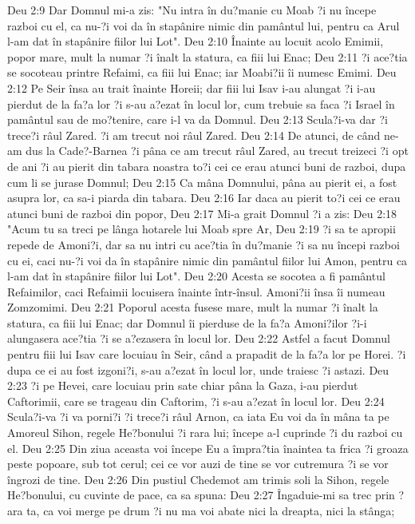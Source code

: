 Deu 2:9  Dar Domnul mi-a zis: "Nu intra în du?manie cu Moab ?i nu începe razboi cu el, ca nu-?i voi da în stapânire nimic din pamântul lui, pentru ca Arul l-am dat în stapânire fiilor lui Lot".
Deu 2:10  Înainte au locuit acolo Emimii, popor mare, mult la numar ?i înalt la statura, ca fiii lui Enac;
Deu 2:11  ?i ace?tia se socoteau printre Refaimi, ca fiii lui Enac; iar Moabi?ii îi numesc Emimi.
Deu 2:12  Pe Seir însa au trait înainte Horeii; dar fiii lui Isav i-au alungat ?i i-au pierdut de la fa?a lor ?i s-au a?ezat în locul lor, cum trebuie sa faca ?i Israel în pamântul sau de mo?tenire, care i-l va da Domnul.
Deu 2:13  Scula?i-va dar ?i trece?i râul Zared. ?i am trecut noi râul Zared.
Deu 2:14  De atunci, de când ne-am dus la Cade?-Barnea ?i pâna ce am trecut râul Zared, au trecut treizeci ?i opt de ani ?i au pierit din tabara noastra to?i cei ce erau atunci buni de razboi, dupa cum li se jurase Domnul;
Deu 2:15  Ca mâna Domnului, pâna au pierit ei, a fost asupra lor, ca sa-i piarda din tabara.
Deu 2:16  Iar daca au pierit to?i cei ce erau atunci buni de razboi din popor,
Deu 2:17  Mi-a grait Domnul ?i a zis:
Deu 2:18  "Acum tu sa treci pe lânga hotarele lui Moab spre Ar,
Deu 2:19  ?i sa te apropii repede de Amoni?i, dar sa nu intri cu ace?tia în du?manie ?i sa nu începi razboi cu ei, caci nu-?i voi da în stapânire nimic din pamântul fiilor lui Amon, pentru ca l-am dat în stapânire fiilor lui Lot".
Deu 2:20  Acesta se socotea a fi pamântul Refaimilor, caci Refaimii locuisera înainte într-însul. Amoni?ii însa îi numeau Zomzomimi.
Deu 2:21  Poporul acesta fusese mare, mult la numar ?i înalt la statura, ca fiii lui Enac; dar Domnul îi pierduse de la fa?a Amoni?ilor ?i-i alungasera ace?tia ?i se a?ezasera în locul lor.
Deu 2:22  Astfel a facut Domnul pentru fiii lui Isav care locuiau în Seir, când a prapadit de la fa?a lor pe Horei. ?i dupa ce ei au fost izgoni?i, s-au a?ezat în locul lor, unde traiesc ?i astazi.
Deu 2:23  ?i pe Hevei, care locuiau prin sate chiar pâna la Gaza, i-au pierdut Caftorimii, care se trageau din Caftorim, ?i s-au a?ezat în locul lor.
Deu 2:24  Scula?i-va ?i va porni?i ?i trece?i râul Arnon, ca iata Eu voi da în mâna ta pe Amoreul Sihon, regele He?bonului ?i rara lui; începe a-l cuprinde ?i du razboi cu el.
Deu 2:25  Din ziua aceasta voi începe Eu a împra?tia înaintea ta frica ?i groaza peste popoare, sub tot cerul; cei ce vor auzi de tine se vor cutremura ?i se vor îngrozi de tine.
Deu 2:26  Din pustiul Chedemot am trimis soli la Sihon, regele He?bonului, cu cuvinte de pace, ca sa spuna:
Deu 2:27  Îngaduie-mi sa trec prin ?ara ta, ca voi merge pe drum ?i nu ma voi abate nici la dreapta, nici la stânga;
